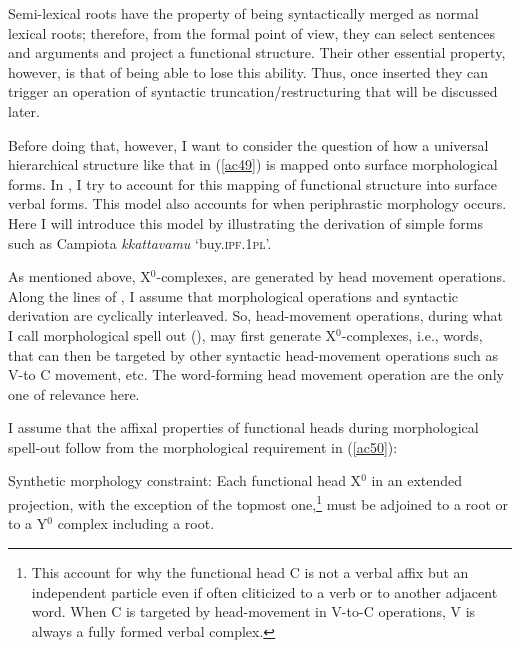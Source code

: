 \documentclass[output=paper]{langscibook}
\begin{document}
Semi-lexical roots have the property of being syntactically merged as normal lexical roots; therefore, from the formal point of view, they can select sentences and arguments and project a functional structure.  Their other essential property, however, is that of being able to lose this ability. Thus, once inserted they can trigger an operation of syntactic truncation\slash restructuring that will be discussed later. 

Before doing that, however, I want to consider  the question of how a universal hierarchical structure like that in (\ref{ac49}) is mapped onto surface morphological forms. In \citet{calabrese2019a}, I try to account for this mapping of functional structure into surface verbal forms. This model also accounts for when periphrastic morphology occurs. Here I will introduce this model by illustrating the derivation of simple forms such as Campiota \textit{kkattavamu} ‘buy.\textsc{ipf}.\textsc{1pl}’.

As mentioned above, X$^0$-complexes, are generated by head movement operations. Along the lines of \citet{calabrese2014a}, I assume that morphological operations and syntactic derivation are cyclically interleaved. So, head-movement operations, during what I call morphological spell out (\cite{calabrese2019a}), may first generate X$^0$-complexes, i.e., words, that can then be targeted by other syntactic head-movement operations such as V-to C movement, etc. The word-forming head movement operation are the only one of relevance here.  

I assume that the affixal properties of functional heads during morphological spell-out follow from the morphological requirement in (\ref{ac50}):

\ea \label{ac50}Synthetic morphology constraint:       
Each functional head X$^0$ in an extended projection, with the exception of the topmost one,\footnote{This account for why the functional head C is not a verbal affix but an independent particle even if often cliticized to a verb or to another adjacent word.  When C is targeted by head-movement in V-to-C operations, V is always a fully formed verbal complex.} must be adjoined to a root or to a Y$^0$ complex including a root.
\z
\end{document}
